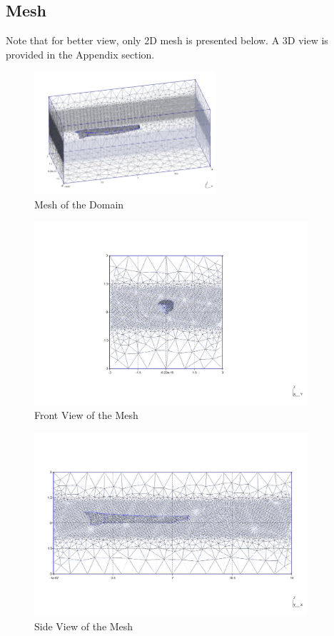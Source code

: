 \documentclass[12pt]{article} %
\begin{document}
\subsection{Mesh}
Note that for better view, only 2D mesh is presented below. A 3D view is provided in the Appendix section.
\begin{figure}[ht]
    \centering
    \includegraphics[width=0.6\textwidth]{Mesh_1.png}
    \caption{Mesh of the Domain}
    
\end{figure}
\begin{figure}[ht]
    \centering
    \includegraphics[width=0.9\textwidth]{Mesh_2.png}
    \caption{Front View of the Mesh}
\end{figure}

\begin{figure}[ht]
    \centering
    \includegraphics[width=0.9\textwidth]{Mesh_3.png}
    \caption{Side View of the Mesh}
\end{figure}
\end{document}
